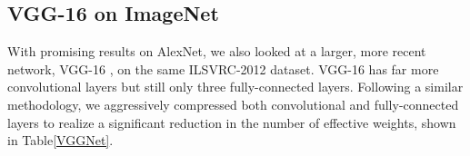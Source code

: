 \documentclass{article} %
\begin{document}
\subsection{VGG-16 on ImageNet}
With promising results on AlexNet, we also looked at a larger, more recent network, VGG-16 \citep{simonyan2014very}, on the same ILSVRC-2012 dataset.  VGG-16 has far more convolutional layers but still only three fully-connected layers.  Following a similar methodology, we aggressively compressed both convolutional and fully-connected layers to realize a significant reduction in the number of effective weights, shown in Table\ref{VGGNet}.


\begin{table}[t]
\centering
\caption{Compression statistics for VGG-16. P: pruning, Q:quantization, H:Huffman coding.}
\end{table}
\end{document}
